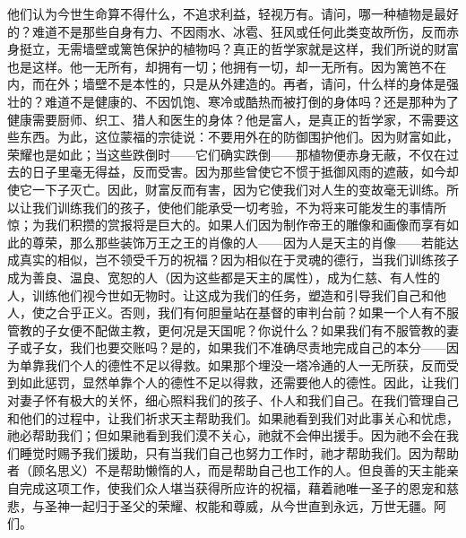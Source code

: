 他们认为今世生命算不得什么，不追求利益，轻视万有。请问，哪一种植物是最好的？难道不是那些自身有力、不因雨水、冰雹、狂风或任何此类变故所伤，反而赤身挺立，无需墙壁或篱笆保护的植物吗？真正的哲学家就是这样，我们所说的财富也是这样。他一无所有，却拥有一切；他拥有一切，却一无所有。因为篱笆不在内，而在外；墙壁不是本性的，只是从外建造的。再者，请问，什么样的身体是强壮的？难道不是健康的、不因饥饱、寒冷或酷热而被打倒的身体吗？还是那种为了健康需要厨师、织工、猎人和医生的身体？他是富人，是真正的哲学家，不需要这些东西。为此，这位蒙福的宗徒说：不要用外在的防御围护他们。因为财富如此，荣耀也是如此；当这些跌倒时——它们确实跌倒——那植物便赤身无蔽，不仅在过去的日子里毫无得益，反而受害。因为那些曾使它不惯于抵御风雨的遮蔽，如今却使它一下子灭亡。因此，财富反而有害，因为它使我们对人生的变故毫无训练。所以让我们训练我们的孩子，使他们能承受一切考验，不为将来可能发生的事情所惊；为我们积攒的赏报将是巨大的。如果人们因为制作帝王的雕像和画像而享有如此的尊荣，那么那些装饰万王之王的肖像的人——因为人是天主的肖像——若能达成真实的相似，岂不领受千万的祝福？因为相似在于灵魂的德行，当我们训练孩子成为善良、温良、宽恕的人（因为这些都是天主的属性），成为仁慈、有人性的人，训练他们视今世如无物时。让这成为我们的任务，塑造和引导我们自己和他人，使之合乎正义。否则，我们有何胆量站在基督的审判台前？如果一个人有不服管教的子女便不配做主教，更何况是天国呢？你说什么？如果我们有不服管教的妻子或子女，我们也要交账吗？是的，如果我们不准确尽责地完成自己的本分——因为单靠我们个人的德性不足以得救。如果那个埋没一塔冷通的人一无所获，反而受到如此惩罚，显然单靠个人的德性不足以得救，还需要他人的德性。因此，让我们对妻子怀有极大的关怀，细心照料我们的孩子、仆人和我们自己。在我们管理自己和他们的过程中，让我们祈求天主帮助我们。如果祂看到我们对此事关心和忧虑，祂必帮助我们；但如果祂看到我们漠不关心，祂就不会伸出援手。因为祂不会在我们睡觉时赐予我们援助，只有当我们自己也努力工作时，祂才帮助我们。因为帮助者（顾名思义）不是帮助懒惰的人，而是帮助自己也工作的人。但良善的天主能亲自完成这项工作，使我们众人堪当获得所应许的祝福，藉着祂唯一圣子的恩宠和慈悲，与圣神一起归于圣父的荣耀、权能和尊威，从今世直到永远，万世无疆。阿们。\par



